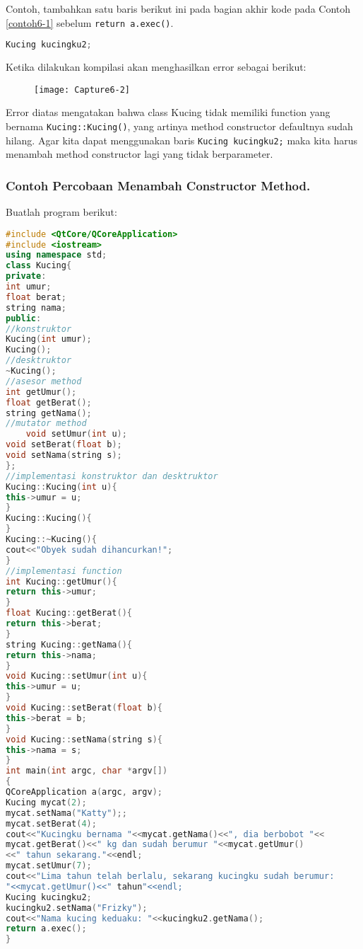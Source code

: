 Contoh, tambahkan satu baris berikut ini pada bagian akhir kode pada
Contoh \ref{contoh6-1} sebelum \texttt{return\ a.exec()}.

\begin{lstlisting}[language=c++, numbers=none]
Kucing kucingku2;
\end{lstlisting}

Ketika dilakukan kompilasi akan menghasilkan error sebagai berikut:

\begin{figure}[htbp]
\centering
\texttt{[image: Capture6-2]}

\end{figure}

Error diatas mengatakan bahwa class Kucing tidak memiliki function yang
bernama \texttt{Kucing::Kucing()}, yang artinya method constructor
defaultnya sudah hilang. Agar kita dapat menggunakan baris
\texttt{Kucing\ kucingku2;} maka kita harus menambah method constructor
lagi yang tidak berparameter.

\subsubsection*{Contoh  Percobaan Menambah Constructor Method.}

Buatlah program berikut:

\begin{lstlisting}[language=c++, caption=Percobaan Menambah Constructor Method, label=contoh6-9]
#include <QtCore/QCoreApplication>
#include <iostream>
using namespace std;
class Kucing{
private:
int umur;
float berat;
string nama;
public:
//konstruktor
Kucing(int umur);
Kucing();
//desktruktor
~Kucing();
//asesor method
int getUmur();
float getBerat();
string getNama();
//mutator method
    void setUmur(int u);
void setBerat(float b);
void setNama(string s);
};
//implementasi konstruktor dan desktruktor
Kucing::Kucing(int u){
this->umur = u;
}
Kucing::Kucing(){
}
Kucing::~Kucing(){
cout<<"Obyek sudah dihancurkan!";
}
//implementasi function
int Kucing::getUmur(){
return this->umur;
}
float Kucing::getBerat(){
return this->berat;
}
string Kucing::getNama(){
return this->nama;
}
void Kucing::setUmur(int u){
this->umur = u;
}
void Kucing::setBerat(float b){
this->berat = b;
}
void Kucing::setNama(string s){
this->nama = s;
}
int main(int argc, char *argv[])
{
QCoreApplication a(argc, argv);
Kucing mycat(2);
mycat.setNama("Katty");;
mycat.setBerat(4);
cout<<"Kucingku bernama "<<mycat.getNama()<<", dia berbobot "<<
mycat.getBerat()<<" kg dan sudah berumur "<<mycat.getUmur()
<<" tahun sekarang."<<endl;
mycat.setUmur(7);
cout<<"Lima tahun telah berlalu, sekarang kucingku sudah berumur:
"<<mycat.getUmur()<<" tahun"<<endl;
Kucing kucingku2;
kucingku2.setNama("Frizky");
cout<<"Nama kucing keduaku: "<<kucingku2.getNama();
return a.exec();
}
\end{lstlisting}


